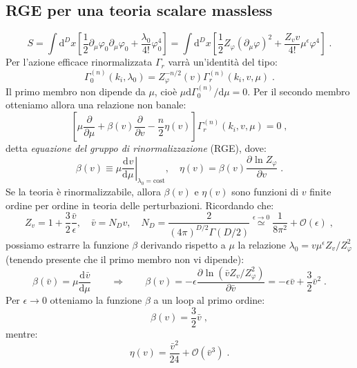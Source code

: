 \documentclass[12pt,a4paper]{article}
\theoremstyle{definition}
\newcommand{\pdev}[3][]{\frac{\partial^{#1} #2}{\partial #3^{#1}}}
\newcommand{\dev}[3][]{\frac{\mathrm{d}^{#1} #2}{\mathrm{d} #3^{#1}}}
\numberwithin{equation}{section}
\newcommand{\diff}[1][]{\mathrm{d}#1}
\begin{document}
\subsection{RGE per una teoria scalare massless}
\begin{equation}
S=\int\diff^D{x}\left[\frac{1}{2}\partial_{\mu}\varphi_0\partial_{\mu}\varphi_0+\frac{\lambda_0}{4!}\varphi_0^4\right]=\int\diff^D{x}\left[\frac{1}{2}Z_{\varphi}(\partial_{\mu}\varphi)^2+\frac{Z_vv}{4!}\mu^{\epsilon}\varphi^4\right]\;.
\end{equation}
Per l'azione efficace rinormalizzata $\Gamma_r$ varrà un'identità del tipo:
\begin{equation}
\Gamma_0^{(n)}(k_i,\lambda_0)=Z_{\varphi}^{-n/2}(v)\Gamma_r^{(n)}(k_i,v,\mu)\;.
\end{equation}
Il primo membro non dipende da $\mu$, cioè $\mu \diff{\Gamma_0^{(n)}}/\diff{\mu}=0$. Per il secondo membro otteniamo allora una relazione non banale:
\begin{equation}
\boxed{
\left[\mu\frac{\partial}{\partial\mu}+\beta(v)\frac{\partial}{\partial v}-\frac{n}{2}\eta(v)\right]\Gamma_r^{(n)}(k_i,v,\mu)=0
}\;, \label{sec5_nonbanale}
\end{equation}
detta \emph{equazione del gruppo di rinormalizzazione} (RGE), dove:
\begin{equation}
\beta(v)\equiv \mu\left.\dev{v}{\mu}\right|_{\lambda_0=\mbox{cost}},\quad \eta(v)=\beta(v)\pdev{\ln Z_{\varphi}}{v}\;.
\end{equation}
Se la teoria è rinormalizzabile, allora $\beta(v)$ e $\eta(v)$ sono funzioni di $v$ finite ordine per ordine in teoria delle perturbazioni. Ricordando che:
$$
Z_v=1+\frac{3}{2}\frac{\bar{v}}{\epsilon},\quad \bar{v}=N_Dv,\quad N_D=\frac{2}{(4\pi)^{D/2}\Gamma(D/2)}\stackrel{\epsilon\to 0}{\simeq}\frac{1}{8\pi^2}+\mathcal{O}(\epsilon)\;,
$$
possiamo estrarre la funzione $\beta$ derivando rispetto a $\mu$ la relazione $\lambda_0=v\mu^{\epsilon}Z_v/Z_{\varphi}^2$ (tenendo presente che il primo membro non vi dipende):
\begin{equation}
\beta(\bar{v})=\mu\dev{\bar{v}}{\mu}\qquad \Longrightarrow\qquad
\boxed{
\beta(v)=-\epsilon\pdev{\ln(\bar{v}Z_v/Z_{\varphi}^2)}{\bar{v}}=-\epsilon\bar{v}+\frac{3}{2}\bar{v}^2
}\;.
\end{equation}
Per $\epsilon\to 0$ otteniamo la funzione $\beta$ a un loop al primo ordine:
\begin{equation}
\beta(v)=\frac{3}{2}\bar{v}\;,
\end{equation}
mentre:
\begin{equation}
\eta(v)=\frac{\bar{v}^2}{24}+\mathcal{O}(\bar{v}^3)\;.
\end{equation}
\end{document}
